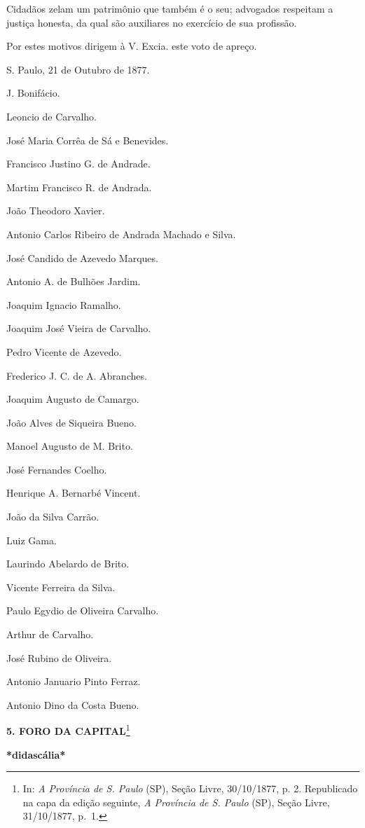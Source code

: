 Cidadãos zelam um patrimônio que também é o seu; advogados respeitam a
justiça honesta, da qual são auxiliares no exercício de sua profissão.

Por estes motivos dirigem à V. Excia. este voto de apreço.

S. Paulo, 21 de Outubro de 1877.

J. Bonifácio.

Leoncio de Carvalho.

José Maria Corrêa de Sá e Benevides.

Francisco Justino G. de Andrade.

Martim Francisco R. de Andrada.

João Theodoro Xavier.

Antonio Carlos Ribeiro de Andrada Machado e Silva.

José Candido de Azevedo Marques.

Antonio A. de Bulhões Jardim.

Joaquim Ignacio Ramalho.

Joaquim José Vieira de Carvalho.

Pedro Vicente de Azevedo.

Frederico J. C. de A. Abranches.

Joaquim Augusto de Camargo.

João Alves de Siqueira Bueno.

Manoel Augusto de M. Brito.

José Fernandes Coelho.

Henrique A. Bernarbé Vincent.

João da Silva Carrão.

Luiz Gama.

Laurindo Abelardo de Brito.

Vicente Ferreira da Silva.

Paulo Egydio de Oliveira Carvalho.

Arthur de Carvalho.

José Rubino de Oliveira.

Antonio Januario Pinto Ferraz.

Antonio Dino da Costa Bueno.

\textbf{5. FORO DA CAPITAL}\footnote{In: \emph{A Província de S. Paulo}
  (SP), Seção Livre, 30/10/1877, p. 2. Republicado na capa da edição
  seguinte, \emph{A Província de S. Paulo} (SP), Seção Livre,
  31/10/1877, p.~1.}

\textbf{*didascália*}

